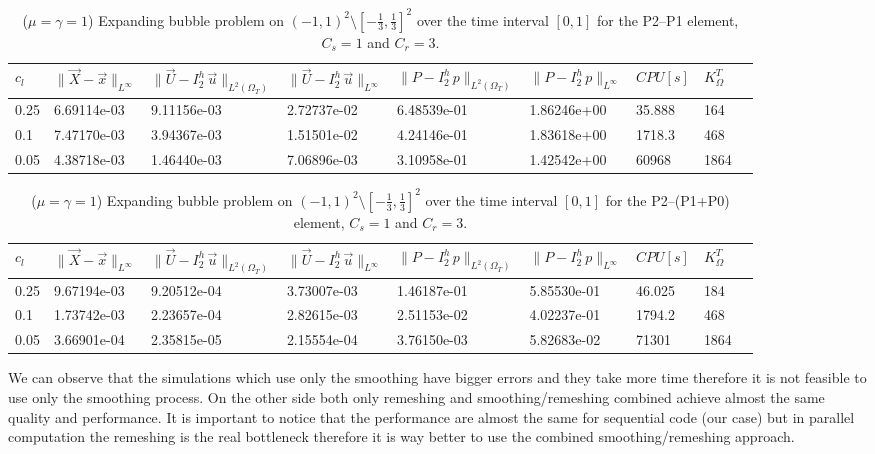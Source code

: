\documentclass[a4paper,12pt,onecolumn]{article}
\newcommand{\errorXx}{\|\vec{X} - \vec{x}\|_{L^\infty}}
\newcommand{\LerrorUu}[1]{\|\vec U - I^h_{#1}\,\vec u\|_{L^2(\Omega_T)}}
\newcommand{\errorUu}[1]{\|\vec U - I^h_{#1}\,\vec u\|_{L^\infty}}
\newcommand{\errorPp}[1]{\|P - I^h_{#1}\,p\|_{L^\infty}}
\newcommand{\LerrorPp}[1]{\|P - I^h_{#1}\,p\|_{L^2(\Omega_T)}}
\begin{document}
\begin{table}
 \center
 \hspace*{-2cm}
\begin{tabular}{lllllllll}
\hline
$c_l$ & $\errorXx$ & $\LerrorUu2$ & $\errorUu2$ & $\LerrorPp2$ & $\errorPp2$ & $CPU[s]$ & $K_\Omega^T$\\
\hline
0.25 & 6.69114e-03 & 9.11156e-03 & 2.72737e-02 & 6.48539e-01 & 1.86246e+00 & 35.888 & 164\\
0.1 & 7.47170e-03 & 3.94367e-03 & 1.51501e-02 & 4.24146e-01 & 1.83618e+00 & 1718.3 & 468\\
0.05 & 4.38718e-03 & 1.46440e-03 & 7.06896e-03 & 3.10958e-01 & 1.42542e+00 & 60968 & 1864\\
\hline
\end{tabular}
\hspace*{-2cm}
\caption{($\mu=\gamma=1$) Expanding bubble problem on $(-1,1)^2\setminus[-\frac{1}{3},\frac{1}{3}]^2$ over the time interval $[0,1]$ for the P2--P1 element, $C_s=1$ and $C_r=3$.}
\label{tab:expandingbubble2Dp2p1all}
\end{table}

\begin{table}
 \center
 \hspace*{-2cm}
\begin{tabular}{lllllllll}
\hline
$c_l$ & $\errorXx$ & $\LerrorUu2$ & $\errorUu2$ & $\LerrorPp2$ & $\errorPp2$ & $CPU[s]$ & $K_\Omega^T$\\
\hline
0.25 & 9.67194e-03 & 9.20512e-04 & 3.73007e-03 & 1.46187e-01 & 5.85530e-01 & 46.025 & 184\\
0.1 & 1.73742e-03 & 2.23657e-04 & 2.82615e-03 & 2.51153e-02 & 4.02237e-01 & 1794.2 & 468\\
0.05 & 3.66901e-04 & 2.35815e-05 & 2.15554e-04 & 3.76150e-03 & 5.82683e-02 & 71301 & 1864\\
\hline
\end{tabular}
\hspace*{-2cm}
\caption{($\mu=\gamma=1$) Expanding bubble problem on $(-1,1)^2\setminus[-\frac{1}{3},\frac{1}{3}]^2$ over the time interval $[0,1]$ for the P2--(P1+P0) element, $C_s=1$ and $C_r=3$.}
\label{tab:expandingbubble2Dp2p1p0all}
\end{table}

We can observe that the simulations which use only the smoothing have bigger errors and they take more time therefore it is not feasible to use only the smoothing process. On the other side both only remeshing and smoothing/remeshing combined achieve almost the same quality and performance. It is important to notice that the performance are almost the same for sequential code (our case) but in parallel computation the remeshing is the real bottleneck therefore it is way better to use the combined smoothing/remeshing approach.  
\newline
\end{document}
